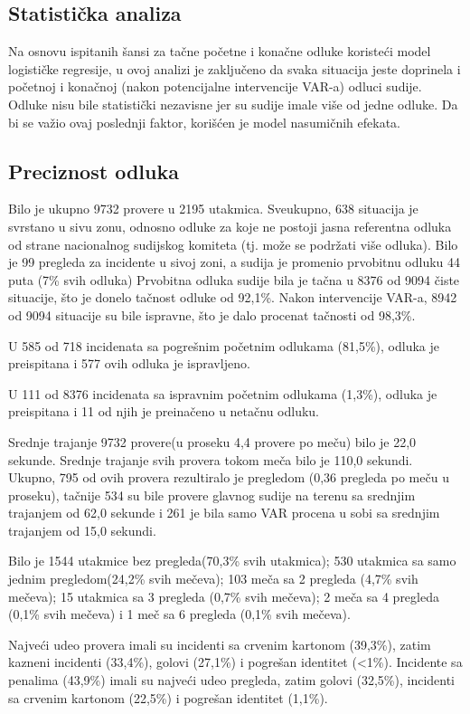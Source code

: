 \documentclass[a4paper]{article}
\begin{document}
\subsection{Statistička analiza}
Na osnovu ispitanih šansi za tačne početne i konačne odluke koristeći model logističke regresije, u ovoj analizi je zaključeno da svaka situacija jeste doprinela i početnoj i konačnoj (nakon potencijalne intervencije VAR-a) odluci sudije. Odluke nisu bile statistički nezavisne jer su sudije imale više od jedne odluke. Da bi se važio ovaj poslednji faktor, korišćen je model nasumičnih efekata. 


\subsection{Preciznost odluka} 
Bilo je ukupno 9732 provere u 2195 utakmica. Sveukupno, 638 situacija je svrstano u sivu zonu, odnosno odluke za koje ne postoji jasna referentna odluka od strane nacionalnog sudijskog komiteta (tj. može se podržati više odluka). Bilo je 99 pregleda za incidente u sivoj zoni, a sudija je promenio prvobitnu odluku 44 puta (7\% svih odluka)
Prvobitna odluka sudije bila je tačna u 8376 od 9094 čiste situacije, što je donelo tačnost odluke od 92,1\%. Nakon intervencije VAR-a, 8942 od 9094 situacije su bile ispravne, što je dalo procenat tačnosti od 98,3\%.  

U 585 od 718 incidenata sa pogrešnim početnim odlukama (81,5\%), odluka je preispitana i 577 ovih odluka je ispravljeno. 

U 111 od 8376 incidenata sa ispravnim početnim odlukama (1,3\%), odluka je preispitana i 11 od njih je preinačeno u netačnu odluku. 

Srednje trajanje 9732 provere(u proseku 4,4 provere po meču) bilo je 22,0 sekunde. Srednje trajanje svih provera tokom meča bilo je 110,0 sekundi. 
Ukupno, 795 od ovih provera rezultiralo je pregledom (0,36 pregleda po meču u proseku), tačnije 534 su bile provere glavnog sudije na terenu sa srednjim trajanjem od 62,0 sekunde i 261 je bila samo VAR procena u sobi sa srednjim trajanjem od 15,0 sekundi. 

Bilo je 1544 utakmice bez pregleda(70,3\% svih utakmica); 530 utakmica sa samo jednim pregledom(24,2\% svih mečeva); 103 meča sa 2 pregleda (4,7\% svih mečeva); 15 utakmica sa 3 pregleda (0,7\% svih mečeva); 2 meča sa 4 pregleda (0,1\% svih mečeva) i 1 meč sa 6 pregleda (0,1\% svih mečeva).

Najveći udeo provera imali su incidenti sa crvenim kartonom (39,3\%), zatim kazneni incidenti (33,4\%), golovi (27,1\%) i pogrešan identitet (<1\%). Incidente sa penalima (43,9\%) imali su najveći udeo pregleda, zatim golovi (32,5\%), incidenti sa crvenim kartonom (22,5\%) i pogrešan identitet (1,1\%).
\end{document}
